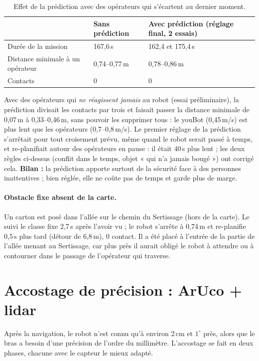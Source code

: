 \documentclass[11pt,a4paper]{article}
\begin{document}
\begin{table}[h]
\centering\small
\begin{tabularx}{\linewidth}{@{}lLL@{}}
\toprule
& \textbf{Sans prédiction} & \textbf{Avec prédiction (réglage final, 2 essais)} \\
\midrule
Durée de la mission & 167,6\,s & 162,4 et 175,4\,s \\
Distance minimale à un opérateur & 0,74--0,77\,m & 0,78--0,86\,m \\
Contacts & 0 & 0 \\
\bottomrule
\end{tabularx}
\caption{Effet de la prédiction avec des opérateurs qui s'écartent au dernier moment.}
\end{table}

Avec des opérateurs qui \emph{ne réagissent jamais} au robot (essai préliminaire), la prédiction
divisait les contacts par trois et faisait passer la distance minimale de 0,07\,m à 0,33--0,46\,m,
sans pouvoir les supprimer tous : le youBot (0,45\,m/s) est plus lent que les opérateurs
(0,7--0,8\,m/s). Le premier réglage de la prédiction s'arrêtait pour tout croisement prévu, même
quand le robot serait passé à temps, et re-planifiait autour des opérateurs en pause : il était
40\,s plus lent ; les deux règles ci-dessus (conflit dans le temps, objet « qui n'a jamais bougé »)
ont corrigé cela. \textbf{Bilan :} la prédiction apporte surtout de la sécurité face à des
personnes inattentives ; bien réglée, elle ne coûte pas de temps et garde plus de marge.

\paragraph{Obstacle fixe absent de la carte.} Un carton est posé dans l'allée sur le chemin du
Sertissage (hors de la carte). Le suivi le classe fixe 2,7\,s après l'avoir vu ; le robot s'arrête
à 0,74\,m et re-planifie 0,5\,s plus tard (détour de 6,8\,m), 0 contact. Il a été placé à l'entrée
de la partie de l'allée menant au Sertissage, car plus près il aurait obligé le robot à attendre
ou à contourner dans le passage de l'opérateur qui traverse.

\section{Accostage de précision : ArUco + lidar}\label{sec:dock}

Après la navigation, le robot n'est connu qu'à environ 2\,cm et $1^\circ$ près, alors que le bras a besoin
d'une précision de l'ordre du millimètre. L'accostage se fait en deux phases, chacune avec le
capteur le mieux adapté.
\end{document}
